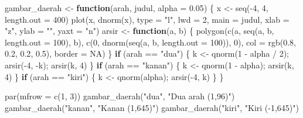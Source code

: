 \documentclass[
  indonesian,
  letterpaper,
]{book}
\newenvironment{Shaded}{\begin{snugshade}}{\end{snugshade}}
\newcommand{\AttributeTok}[1]{\textcolor[rgb]{0.40,0.45,0.13}{#1}}
\newcommand{\ConstantTok}[1]{\textcolor[rgb]{0.56,0.35,0.01}{#1}}
\newcommand{\ControlFlowTok}[1]{\textcolor[rgb]{0.00,0.23,0.31}{\textbf{#1}}}
\newcommand{\DecValTok}[1]{\textcolor[rgb]{0.68,0.00,0.00}{#1}}
\newcommand{\FloatTok}[1]{\textcolor[rgb]{0.68,0.00,0.00}{#1}}
\newcommand{\FunctionTok}[1]{\textcolor[rgb]{0.28,0.35,0.67}{#1}}
\newcommand{\NormalTok}[1]{\textcolor[rgb]{0.00,0.23,0.31}{#1}}
\newcommand{\OtherTok}[1]{\textcolor[rgb]{0.00,0.23,0.31}{#1}}
\newcommand{\SpecialCharTok}[1]{\textcolor[rgb]{0.37,0.37,0.37}{#1}}
\newcommand{\StringTok}[1]{\textcolor[rgb]{0.13,0.47,0.30}{#1}}
\begin{document}
\begin{Shaded}
\begin{Highlighting}[]
\NormalTok{gambar\_daerah }\OtherTok{\textless{}{-}} \ControlFlowTok{function}\NormalTok{(arah, judul, }\AttributeTok{alpha =} \FloatTok{0.05}\NormalTok{) \{}
\NormalTok{  x }\OtherTok{\textless{}{-}} \FunctionTok{seq}\NormalTok{(}\SpecialCharTok{{-}}\DecValTok{4}\NormalTok{, }\DecValTok{4}\NormalTok{, }\AttributeTok{length.out =} \DecValTok{400}\NormalTok{)}
  \FunctionTok{plot}\NormalTok{(x, }\FunctionTok{dnorm}\NormalTok{(x), }\AttributeTok{type =} \StringTok{"l"}\NormalTok{, }\AttributeTok{lwd =} \DecValTok{2}\NormalTok{, }\AttributeTok{main =}\NormalTok{ judul, }\AttributeTok{xlab =} \StringTok{"z"}\NormalTok{, }\AttributeTok{ylab =} \StringTok{""}\NormalTok{, }\AttributeTok{yaxt =} \StringTok{"n"}\NormalTok{)}
\NormalTok{  arsir }\OtherTok{\textless{}{-}} \ControlFlowTok{function}\NormalTok{(a, b) \{}
    \FunctionTok{polygon}\NormalTok{(}\FunctionTok{c}\NormalTok{(a, }\FunctionTok{seq}\NormalTok{(a, b, }\AttributeTok{length.out =} \DecValTok{100}\NormalTok{), b),}
            \FunctionTok{c}\NormalTok{(}\DecValTok{0}\NormalTok{, }\FunctionTok{dnorm}\NormalTok{(}\FunctionTok{seq}\NormalTok{(a, b, }\AttributeTok{length.out =} \DecValTok{100}\NormalTok{)), }\DecValTok{0}\NormalTok{),}
            \AttributeTok{col =} \FunctionTok{rgb}\NormalTok{(}\FloatTok{0.8}\NormalTok{, }\FloatTok{0.2}\NormalTok{, }\FloatTok{0.2}\NormalTok{, }\FloatTok{0.5}\NormalTok{), }\AttributeTok{border =} \ConstantTok{NA}\NormalTok{)}
\NormalTok{  \}}
  \ControlFlowTok{if}\NormalTok{ (arah }\SpecialCharTok{==} \StringTok{"dua"}\NormalTok{)   \{ k }\OtherTok{\textless{}{-}} \FunctionTok{qnorm}\NormalTok{(}\DecValTok{1} \SpecialCharTok{{-}}\NormalTok{ alpha }\SpecialCharTok{/} \DecValTok{2}\NormalTok{); }\FunctionTok{arsir}\NormalTok{(}\SpecialCharTok{{-}}\DecValTok{4}\NormalTok{, }\SpecialCharTok{{-}}\NormalTok{k); }\FunctionTok{arsir}\NormalTok{(k, }\DecValTok{4}\NormalTok{) \}}
  \ControlFlowTok{if}\NormalTok{ (arah }\SpecialCharTok{==} \StringTok{"kanan"}\NormalTok{) \{ k }\OtherTok{\textless{}{-}} \FunctionTok{qnorm}\NormalTok{(}\DecValTok{1} \SpecialCharTok{{-}}\NormalTok{ alpha);     }\FunctionTok{arsir}\NormalTok{(k, }\DecValTok{4}\NormalTok{) \}}
  \ControlFlowTok{if}\NormalTok{ (arah }\SpecialCharTok{==} \StringTok{"kiri"}\NormalTok{)  \{ k }\OtherTok{\textless{}{-}} \FunctionTok{qnorm}\NormalTok{(alpha);         }\FunctionTok{arsir}\NormalTok{(}\SpecialCharTok{{-}}\DecValTok{4}\NormalTok{, k) \}}
\NormalTok{\}}

\FunctionTok{par}\NormalTok{(}\AttributeTok{mfrow =} \FunctionTok{c}\NormalTok{(}\DecValTok{1}\NormalTok{, }\DecValTok{3}\NormalTok{))}
\FunctionTok{gambar\_daerah}\NormalTok{(}\StringTok{"dua"}\NormalTok{, }\StringTok{"Dua arah (1,96)"}\NormalTok{)}
\FunctionTok{gambar\_daerah}\NormalTok{(}\StringTok{"kanan"}\NormalTok{, }\StringTok{"Kanan (1,645)"}\NormalTok{)}
\FunctionTok{gambar\_daerah}\NormalTok{(}\StringTok{"kiri"}\NormalTok{, }\StringTok{"Kiri ({-}1,645)"}\NormalTok{)}
\end{Highlighting}
\end{Shaded}
\end{document}
